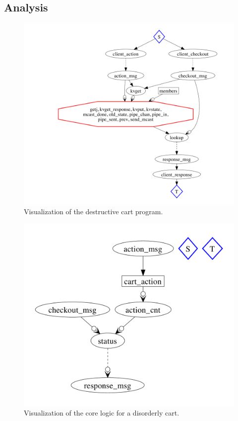 \subsection{Analysis}

\begin{figure}[t]
\centering
\includegraphics[width=1.1\linewidth]{fig/destructive_kvs.pdf}
\vspace{-10pt}
\caption{Visualization of the destructive cart program.}
\label{fig:pdg-destructive-kvs-analysis}
\vspace{-2pt}
\end{figure}

\begin{figure}[t]
\centering
\includegraphics[width=0.8\linewidth]{fig/disorderly_base.pdf}
\vspace{-10pt}
\caption{Visualization of the core logic for a disorderly cart.}
\label{fig:pdg-disorderly-base}
\vspace{-2pt}
\end{figure}

